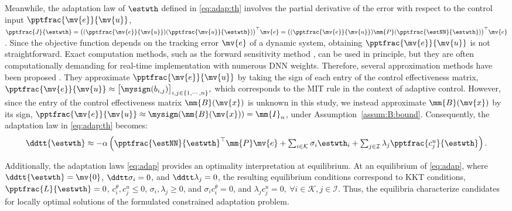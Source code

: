 \documentclass[letterpaper, journal]{IEEEtran}
\begin{document}
Meanwhile, the adaptation law of $\estwth$ defined in \eqref{eq:adap:th} involves the partial derivative of the error with respect to the control input $\pptfrac{\mv{e}}{\mv{u}}$, \ie 
$
    \pptfrac{J}{\estwth}
    =
    \big(
        (\pptfrac{\mv{e}}{\mv{u}})
        (\pptfrac{\mv{u}}{\estwth})
    \big)
    ^\top \mv{e}
    =
    \big(
        (\pptfrac{\mv{e}}{\mv{u}})
        \mm{P}
        (\pptfrac{\estNN}{\estwth})
    \big)
    ^\top \mv{e}
$. 
Since the objective function depends on the tracking error $\mv{e}$ of a dynamic system, obtaining $\pptfrac{\mv{e}}{\mv{u}}$ is not straightforward. 
Exact computation methods, such as the forward sensitivity method \cite{Khalil:2002aa,Ryu:2025ab}, can be used in principle, but they are often computationally demanding for real-time implementation with numerous DNN weights.
Therefore, several approximation methods have been proposed \cite{Douratsos:2007aa,Saerens:1991aa}.
They approximate $\pptfrac{\mv{e}}{\mv{u}}$ by taking the sign of each entry of the control effectiveness matrix, \ie
$
  \pptfrac{\mv{e}}{\mv{u}}
  \approx
  \big[
    \mysign
    (
    b_{i,j}
    )
  \big]_{i,j\in\{1,\cdots,n\}}
  ,
$
which corresponds to the MIT rule in the context of adaptive control.
However, since the entry of the control effectiveness matrix $\mm{B}(\mv{x})$ is unknown in this study, we instead approximate $\mm{B}(\mv{x})$ by its sign, \ie $\pptfrac{\mv{e}}{\mv{u}}\approx\mysign(\mm{B}(\mv{x}))=\mm{I}_{n}$, under Assumption~\ref{assum:B:bound}.
Consequently, the adaptation law in \eqref{eq:adap:th} becomes:
\begin{equation}
  \ddtt{\estwth}
  \approx
  -\alpha 
  \left(
    {\pptfrac{\estNN}
    {\estwth}}^\top
    \mm{P}
    \mv{e}
    +
    \textstyle\sum_{i\in\mathcal{K}}
    \sigma_i 
    \estwth_i
    +
    \textstyle\sum_{j\in\mathcal{I}}
    \lambda_j 
    \pptfrac{c^{u}_{j}}{\estwth}
  \right)
  .
  \label{eq:adap:th:approx}
\end{equation}

Additionally, the adaptation laws \eqref{eq:adap} provides an optimality interpretation at equilibrium.
At an equilibrium of \eqref{eq:adap}, where $\ddtt{\estwth}=\mv{0}$, $\ddtt\sigma_i=0$, and $\ddtt\lambda_j=0$, the resulting equilibrium conditions correspond to KKT conditions, \ie $\pptfrac{L}{\estwth}=0$, $c^{\theta}_i,c^{u}_j \le 0$, $\sigma_i,\lambda_j \ge 0$, and $\sigma_i c^{\theta}_i=0$, and $\lambda_j c^{u}_j=0,\ \forall i\in\mathcal{K},j\in\mathcal{I}$.
Thus, the equilibria characterize candidates for locally optimal solutions of the formulated constrained adaptation problem.
\end{document}
